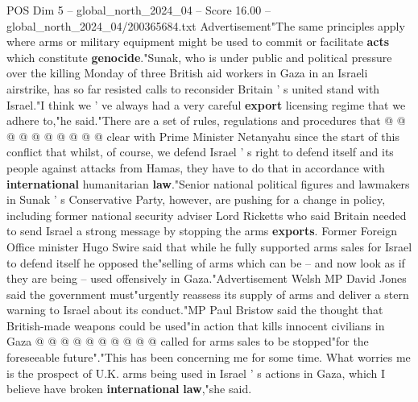 \begin{textsample}{POS Dim 5 – global\_north\_2024\_04 – Score 16.00 – global\_north\_2024\_04/200365684.txt}
Advertisement"The same principles apply where arms or military equipment might be used to commit or facilitate \textbf{acts} which constitute \textbf{genocide}."Sunak, who is under public and political pressure over the killing Monday of three British aid workers in Gaza in an Israeli airstrike, has so far resisted calls to reconsider Britain ' s united stand with Israel."I think we ' ve always had a very careful \textbf{export} licensing regime that we adhere to,"he said."There are a set of rules, regulations and procedures that @ @ @ @ @ @ @ @ @ @ clear with Prime Minister Netanyahu since the start of this conflict that whilst, of course, we defend Israel ' s right to defend itself and its people against attacks from Hamas, they have to do that in accordance with \textbf{international} humanitarian \textbf{law}."Senior national political figures and lawmakers in Sunak ' s Conservative Party, however, are pushing for a change in policy, including former national security adviser Lord Ricketts who said Britain needed to send Israel a strong message by stopping the arms \textbf{exports}.
Former Foreign Office minister Hugo Swire said that while he fully supported arms sales for Israel to defend itself he opposed the"selling of arms which can be -- and now look as if they are being -- used offensively in Gaza."Advertisement Welsh MP David Jones said the government must"urgently reassess its supply of arms and deliver a stern warning to Israel about its conduct."MP Paul Bristow said the thought that British-made weapons could be used"in action that kills innocent civilians in Gaza @ @ @ @ @ @ @ @ @ @ called for arms sales to be stopped"for the foreseeable future"."This has been concerning me for some time.
What worries me is the prospect of U.K. arms being used in Israel ' s actions in Gaza, which I believe have broken \textbf{international} \textbf{law},"she said.

\end{textsample}
